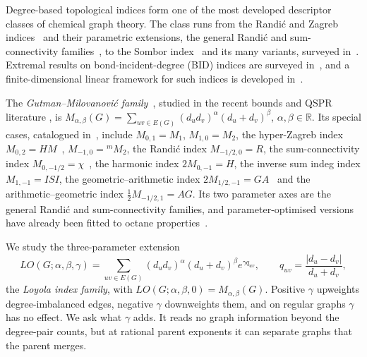 \documentclass[a5paper, 10pt]{article}
\theoremstyle{plain}
\theoremstyle{remark}
\theoremstyle{definition}
\begin{document}
  Degree-based topological indices form one of the most developed
  descriptor classes of chemical graph theory. The class runs from the
  Randi\'c and Zagreb indices~\cite{Randic1975, GutmanTrinajstic1972}
  and their parametric extensions, the general Randi\'c and
  sum-connectivity families~\cite{BollobasErdos1998, ZhouTrinajstic2010},
  to the Sombor index~\cite{Gutman2021Sombor} and its many variants, surveyed in~\cite{Gutman2026SomborSurvey}. Extremal results on
  bond-incident-degree (BID) indices are surveyed
  in~\cite{AliGutmanFurtula2026BID}, and a finite-dimensional linear
  framework for such indices is developed in~\cite{Rada2026LinearVDB}.

  The \emph{Gutman--Milovanovi\'c family}~\cite{GutmanMilovanovic2020AKCE},
  studied in the recent bounds and QSPR literature
  \cite{GranadosJMC2025GM, MolinaSigarreta2025GM, PortillaJMC2025GM},
  is $M_{\alpha,\beta}(G) = \sum_{uv \in E(G)}
  (d_u d_v)^{\alpha} (d_u + d_v)^{\beta}$, $\alpha, \beta \in
  \mathbb{R}$. Its special cases, catalogued
  in~\cite{MolinaSigarreta2025GM}, include $M_{0,1} = M_1$,
  $M_{1,0} = M_2$, the hyper-Zagreb index
  $M_{0,2} = HM$~\cite{ShirdelRezapourSayadi2013HM},
  $M_{-1,0} = {}^{m}\!M_2$, the Randi\'c index $M_{-1/2,0} = R$,
  the sum-connectivity index
  $M_{0,-1/2} = \chi$~\cite{ZhouTrinajstic2009sumconn}, the harmonic
  index $2M_{0,-1} = H$, the inverse sum indeg index $M_{1,-1} = ISI$,
  the geometric--arithmetic index
  $2M_{1/2,-1} = GA$~\cite{VukicevicFurtula2009GA} and the
  arithmetic--geometric index $\tfrac12 M_{-1/2,1} = AG$. Its two
  parameter axes are the general Randi\'c and sum-connectivity
  families, and parameter-optimised versions have already been fitted
  to octane properties~\cite{AliGutmanFurtulaAlbalahiHamza2025}.

  We study the three-parameter extension
  \[
  LO(G;\alpha,\beta,\gamma) = \sum_{uv \in E(G)}
  (d_u d_v)^{\alpha}(d_u+d_v)^{\beta} e^{\gamma q_{uv}},
  \qquad q_{uv} = \frac{|d_u - d_v|}{d_u + d_v},
  \]
  the \emph{Loyola index family}, with $LO(G;\alpha,\beta,0) =
  M_{\alpha,\beta}(G)$. Positive $\gamma$ upweights degree-imbalanced
  edges, negative $\gamma$ downweights them, and on regular graphs
  $\gamma$ has no effect. We ask what $\gamma$ adds. It reads no graph information beyond the degree-pair counts, but at rational parent exponents it can separate graphs that the parent merges.
\end{document}
